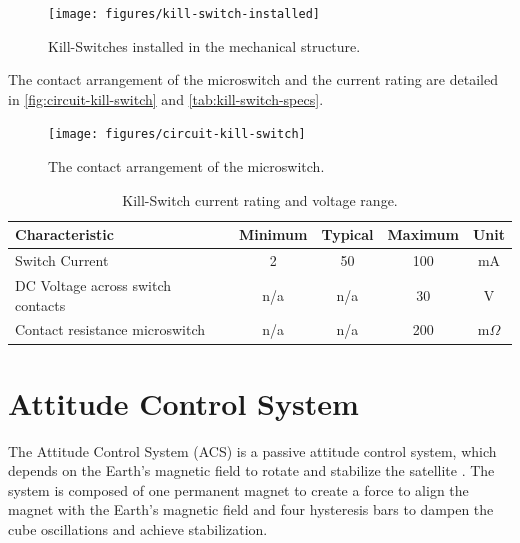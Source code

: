 \begin{figure}[!ht]
    \begin{center}
        \texttt{[image: figures/kill-switch-installed]}
        \caption{Kill-Switches installed in the mechanical structure.}
        \label{fig:kill-switch-installed}
    \end{center}
\end{figure}

The contact arrangement of the microswitch and the current rating are detailed in \autoref{fig:circuit-kill-switch} and \autoref{tab:kill-switch-specs}.

\begin{figure}[!ht]
    \begin{center}
        \texttt{[image: figures/circuit-kill-switch]}
        \caption{The contact arrangement of the microswitch.}
        \label{fig:circuit-kill-switch}
    \end{center}
\end{figure}

\begin{table}[!h]
    \centering
    \begin{tabular}{lcccc}
        \toprule[1.5pt]
        \textbf{Characteristic} & \textbf{Minimum} & \textbf{Typical} & \textbf{Maximum} & \textbf{Unit} \\
        \midrule
        Switch Current                      & 2     & 50    & 100   & mA \\
        DC Voltage across switch contacts   & n/a   & n/a   & 30    & V \\
        Contact resistance microswitch      & n/a   & n/a   & 200   & m$\Omega$ \\
        \bottomrule[1.5pt]
    \end{tabular}
    \caption{Kill-Switch current rating and voltage range.}
    \label{tab:kill-switch-specs}
\end{table}

\section{Attitude Control System}

The Attitude Control System (ACS) is a passive attitude control system, which depends on the Earth's magnetic field to rotate and stabilize the satellite \cite{santoni2009,gerhardt2010}. The system is composed of one permanent magnet to create a force to align the magnet with the Earth's magnetic field and four hysteresis bars to dampen the cube oscillations and achieve stabilization.

